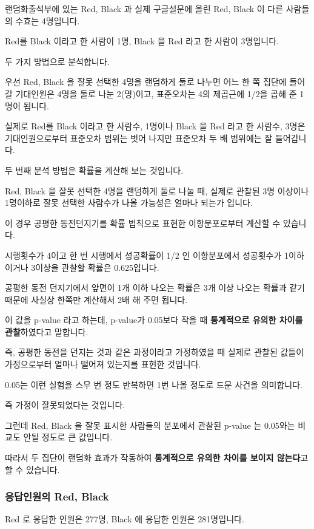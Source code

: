 \documentclass[
]{article}
\begin{document}
랜덤화출석부에 있는 Red, Black 과 실제 구글설문에 올린 Red, Black 이
다른 사람들의 수효는 4명입니다.

Red를 Black 이라고 한 사람이 1명, Black 을 Red 라고 한 사람이 3명입니다.

두 가지 방법으로 분석합니다.

우선 Red, Black 을 잘못 선택한 4명을 랜덤하게 둘로 나누면 어느 한 쪽
집단에 들어갈 기대인원은 4명을 둘로 나눈 2(명)이고, 표준오차는 4의
제곱근에 1/2을 곱해 준 1명이 됩니다.

실제로 Red를 Black 이라고 한 사람수, 1명이나 Black 을 Red 라고 한
사람수, 3명은 기대인원으로부터 표준오차 범위는 벗어 나지만 표준오차 두
배 범위에는 잘 들어갑니다.

두 번째 분석 방법은 확률을 계산해 보는 것입니다.

Red, Black 을 잘못 선택한 4명을 랜덤하게 둘로 나눌 때, 실제로 관찰된 3명
이상이나 1명이하로 잘못 선택한 사람수가 나올 가능성은 얼마나 되는가
입니다.

이 경우 공평한 동전던지기를 확률 법칙으로 표현한 이항분포로부터 계산할
수 있습니다.

시행횟수가 4이고 한 번 시행에서 성공확률이 1/2 인 이항분포에서
성공횟수가 1이하이거나 3이상을 관찰할 확률은 0.625입니다.

공평한 동전 던지기에서 앞면이 1개 이하 나오는 확률은 3개 이상 나오는
확률과 같기 때문에 사실상 한쪽만 계산해서 2배 해 주면 됩니다.

이 값을 p-value 라고 하는데, p-value가 0.05보다 작을 때
\textbf{통계적으로 유의한 차이를 관찰}하였다고 말합니다.

즉, 공평한 동전을 던지는 것과 같은 과정이라고 가정하였을 때 실제로
관찰된 값들이 가정으로부터 얼마나 떨어져 있는지를 표현한 것입니다.

0.05는 이런 실험을 스무 번 정도 반복하면 1번 나올 정도로 드문 사건을
의미합니다.

즉 가정이 잘못되었다는 것입니다.

그런데 Red, Black 을 잘못 표시한 사람들의 분포에서 관찰된 p-value 는
0.05와는 비교도 안될 정도로 큰 값입니다.

따라서 두 집단이 랜덤화 효과가 작동하여 \textbf{통계적으로 유의한 차이를
보이지 않는다}고 할 수 있습니다.

\subsubsection{응답인원의 Red,
Black}\label{uxc751uxb2f5uxc778uxc6d0uxc758-red-black}

Red 로 응답한 인원은 277명, Black 에 응답한 인원은 281명입니다.
\end{document}
